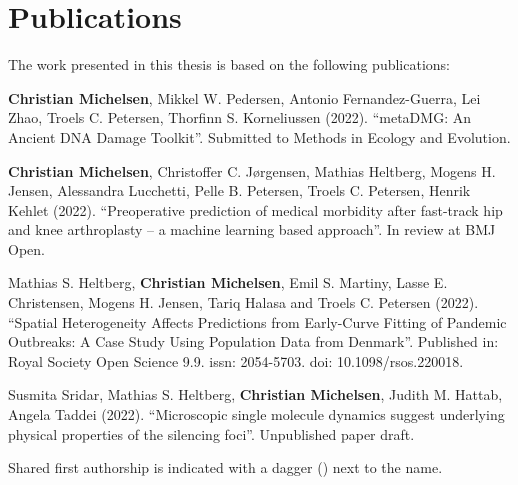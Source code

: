 \chapter{Publications}

The work presented in this thesis is based on the following publications:

\vspace{0.5cm}

\begin{description} [labelindent=1cm,style=multiline,leftmargin=3cm]
	\item [Paper 1:] \textbf{Christian Michelsen}\textsuperscript{\textdagger}, Mikkel W. Pedersen\textsuperscript{\textdagger}, Antonio Fernandez-Guerra, Lei Zhao, Troels C. Petersen, Thorfinn S. Korneliussen (2022). ``metaDMG: An Ancient DNA Damage Toolkit''. Submitted to Methods in Ecology and Evolution. \\
	\item [Paper 2:] \textbf{Christian Michelsen}\textsuperscript{\textdagger}, Christoffer C. Jørgensen\textsuperscript{\textdagger}, Mathias Heltberg, Mogens H. Jensen, Alessandra Lucchetti, Pelle B. Petersen, Troels C. Petersen, Henrik Kehlet (2022). ``Preoperative prediction of medical morbidity after fast-track hip and knee arthroplasty -- a machine learning based approach''. In review at BMJ Open. \\
	\item [Paper 3:] Mathias S. Heltberg\textsuperscript{\textdagger}, \textbf{Christian Michelsen}\textsuperscript{\textdagger}, Emil S. Martiny, Lasse E. Christensen, Mogens H. Jensen, Tariq Halasa and Troels C. Petersen (2022). ``Spatial Heterogeneity Affects Predictions from Early-Curve Fitting of Pandemic Outbreaks: A Case Study Using Population Data from Denmark''. Published in: Royal Society Open Science 9.9. issn: 2054-5703. doi: 10.1098/rsos.220018.  \\
	\item [Paper 4:] Susmita Sridar\textsuperscript{\textdagger}, Mathias S. Heltberg\textsuperscript{\textdagger}, \textbf{Christian Michelsen}\textsuperscript{\textdagger}, Judith M. Hattab, Angela Taddei (2022). ``Microscopic single molecule dynamics suggest underlying physical properties of the silencing foci''. Unpublished paper draft.
\end{description}


\vspace{0.5cm}
\noindent Shared first authorship is indicated with a dagger (\textdagger) next to the name. \\

